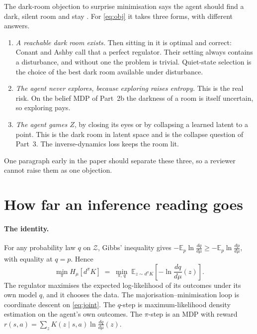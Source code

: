 \documentclass[10pt]{article}
\newcommand{\Hmu}{H_\mu}
\newcommand{\dpi}{d^\pi}
\newcommand{\E}{\mathbb E}
\newcommand{\Zcal}{\mathcal Z}
\begin{document}
The dark-room objection to surprise minimisation says the agent should find a dark, silent room and stay \citep{Friston-free12,Sun-dark20}. For \eqref{eq:obj} it takes three forms, with different answers.
\begin{enumerate}
\item \emph{A reachable dark room exists.} Then sitting in it is optimal and correct: Conant and Ashby call that a perfect regulator. Their setting always contains a disturbance, and without one the problem is trivial. Quiet-state selection is the choice of the best dark room available under disturbance.
\item \emph{The agent never explores, because exploring raises entropy.} This is the real risk. On the belief MDP of Part~2b the darkness of a room is itself uncertain, so exploring pays.
\item \emph{The agent games $Z$}, by closing its eyes or by collapsing a learned latent to a point. This is the dark room in latent space and is the collapse question of Part~3. The inverse-dynamics loss keeps the room lit.
\end{enumerate}
One paragraph early in the paper should separate these three, so a reviewer cannot raise them as one objection.

\section{How far an inference reading goes}

\paragraph{The identity.} For any probability law $q$ on $\Zcal$, Gibbs' inequality gives $-\E_p \ln \frac{dq}{d\mu} \ge -\E_p \ln \frac{dp}{d\mu}$, with equality at $q=p$. Hence
\begin{equation}
  \min_\pi \Hmu[\dpi K] \;=\; \min_{\pi,\, q}\; \E_{z \sim \dpi K}\!\left[-\ln \frac{dq}{d\mu}(z)\right].
  \label{eq:joint}
\end{equation}
The regulator maximises the expected log-likelihood of its outcomes under its own model $q$, and it chooses the data. The majorisation--minimisation loop is coordinate descent on \eqref{eq:joint}. The $q$-step is maximum-likelihood density estimation on the agent's own outcomes. The $\pi$-step is an MDP with reward $r(s,a) = \sum_z K(z\mid s,a) \ln \frac{dq}{d\mu}(z)$.
\end{document}
